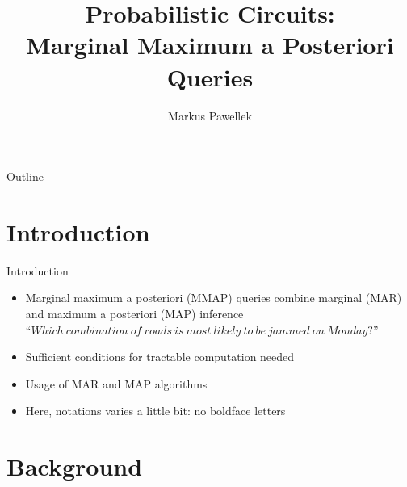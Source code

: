 \documentclass[aspectratio=169]{beamer}
\title{%
  Probabilistic Circuits: \\ Marginal Maximum a Posteriori Queries%
}
\author{Markus Pawellek}
\begin{document}

\frame[plain]{\titlepage}
\begin{frame}[plain]{Outline}
  \footnotesize
  \hfill\parbox[t][7cm][l]{0.9\textwidth}{\tableofcontents}
\end{frame}
\setcounter{framenumber}{0}

\section{Introduction}
  \begin{frame}{Introduction}
    \begin{itemize}
      \item<+-> Marginal maximum a posteriori (MMAP) queries combine marginal (MAR) and maximum a posteriori (MAP) inference \\[1em]
      \enquote{$\mathit{Which\ combination\ of\ roads\ is\ most\ likely\ to\ be\ jammed\ on\ Monday?}$}\\[1em]
      \item<+-> Sufficient conditions for tractable computation needed
      \item<+-> Usage of MAR and MAP algorithms
      \item<+-> Here, notations varies a little bit: no boldface letters
    \end{itemize}
  \end{frame}

\section{Background}
\end{document}
